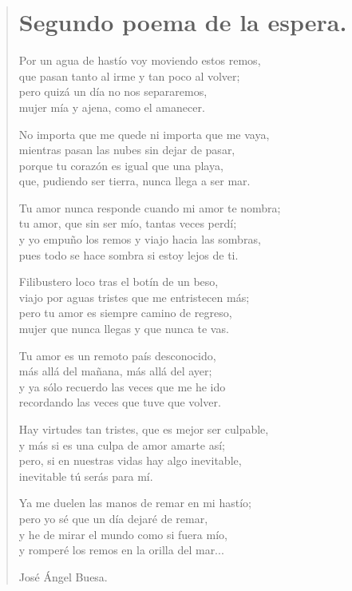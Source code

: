 \documentclass[11pt, portrait, twoside, notitlepage, openright]{book}
\begin{document}
\newpage
\begin{verse}
\begin{center}
\section{Segundo poema de la espera.}
\end{center}
Por un agua de hastío voy moviendo estos remos,\\
que pasan tanto al irme y tan poco al volver;\\
pero quizá un día no nos separaremos,\\
mujer mía y ajena, como el amanecer.
\newline

No importa que me quede ni importa que me vaya,\\
mientras pasan las nubes sin dejar de pasar,\\
porque tu corazón es igual que una playa,\\
que, pudiendo ser tierra, nunca llega a ser mar.
\newline

Tu amor nunca responde cuando mi amor te nombra;\\
tu amor, que sin ser mío, tantas veces perdí;\\
y yo empuño los remos y viajo hacia las sombras,\\
pues todo se hace sombra si estoy lejos de ti.
\newline

Filibustero loco tras el botín de un beso,\\
viajo por aguas tristes que me entristecen más;\\
pero tu amor es siempre camino de regreso,\\
mujer que nunca llegas y que nunca te vas.
\newline

Tu amor es un remoto país desconocido,\\
más allá del mañana, más allá del ayer;\\
y ya sólo recuerdo las veces que me he ido\\
recordando las veces que tuve que volver.
\newpage

Hay virtudes tan tristes, que es mejor ser culpable,\\
y más si es una culpa de amor amarte así;\\
pero, si en nuestras vidas hay algo inevitable,\\
inevitable tú serás para mí.
\newline

Ya me duelen las manos de remar en mi hastío;\\
pero yo sé que un día dejaré de remar,\\
y he de mirar el mundo como si fuera mío,\\
y romperé los remos en la orilla del mar...
\newline

José Ángel Buesa.
\end{verse}
\end{document}
